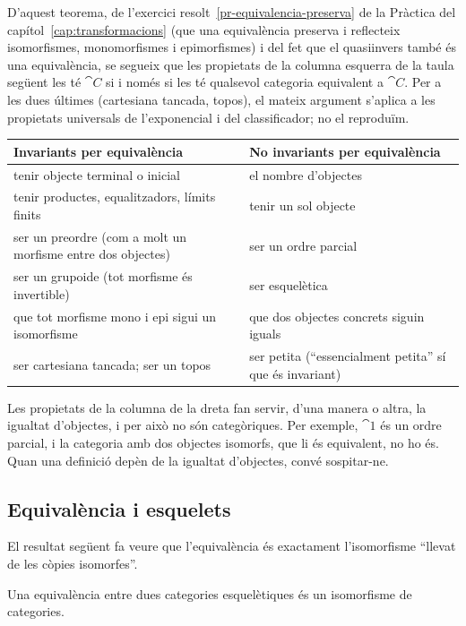 D'aquest teorema, de l'exercici resolt~\ref{pr-equivalencia-preserva} de la Pràctica del capítol~\ref{cap:transformacions} (que una equivalència preserva i reflecteix isomorfismes, monomorfismes i epimorfismes) i del fet que el quasiinvers també és una equivalència, se segueix que les propietats de la columna esquerra de la taula següent les té $\cat{C}$ si i només si les té qualsevol categoria equivalent a $\cat{C}$. Per a les dues últimes (cartesiana tancada, topos), el mateix argument s'aplica a les propietats universals de l'exponencial i del classificador; no el reproduïm.
\begin{center}
\small
\renewcommand{\arraystretch}{1.2}
\begin{tabularx}{\linewidth}{@{}>{\raggedright\arraybackslash}X>{\raggedright\arraybackslash}X@{}}
\toprule
\textbf{Invariants per equivalència} & \textbf{No invariants per equivalència}\\
\midrule
tenir objecte terminal o inicial & el nombre d'objectes\\
tenir productes, equalitzadors, límits finits & tenir un sol objecte\\
ser un preordre (com a molt un morfisme entre dos objectes) & ser un ordre parcial\\
ser un grupoide (tot morfisme és invertible) & ser esquelètica\\
que tot morfisme mono i epi sigui un isomorfisme & que dos objectes concrets siguin iguals\\
ser cartesiana tancada; ser un topos & ser petita (\enquote{essencialment petita} sí que és invariant)\\
\bottomrule
\end{tabularx}
\end{center}
Les propietats de la columna de la dreta fan servir, d'una manera o altra, la igualtat d'objectes, i per això no són categòriques. Per exemple, $\cat{1}$ és un ordre parcial, i la categoria amb dos objectes isomorfs, que li és equivalent, no ho és. Quan una definició depèn de la igualtat d'objectes, convé sospitar-ne.

\subsection{Equivalència i esquelets}

El resultat següent fa veure que l'equivalència és exactament l'isomorfisme \enquote{llevat de les còpies isomorfes}.

\begin{lema}\label{lema:esqueletiques}
Una equivalència entre dues categories esquelètiques és un isomorfisme de categories.
\end{lema}

